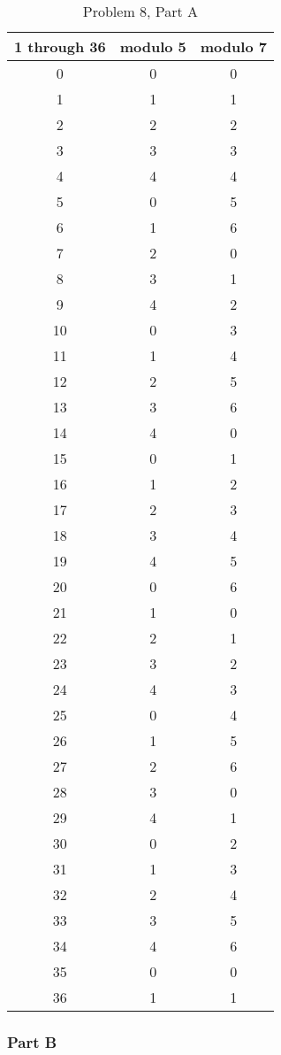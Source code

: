 \documentclass[11pt]{article}
\begin{document}
\begin{table}[htdp]
\caption{Problem 8, Part A}
\begin{center}
\begin{tabular}{|c|c|c|}
\hline
1 through 36 & modulo 5 & modulo 7 \\\hline
0 & 0 & 0 \\
1 & 1 & 1 \\
2 & 2 & 2 \\
3 & 3 & 3 \\
4 & 4 & 4 \\
5 & 0 & 5 \\
6 & 1 & 6 \\
7 & 2 & 0 \\
8 & 3 & 1 \\
9 & 4 & 2 \\
10 & 0 & 3 \\
11 & 1 & 4 \\
12 & 2 & 5 \\
13 & 3 & 6 \\
14 & 4 & 0 \\
15 & 0 & 1 \\
16 & 1 & 2 \\
17 & 2 & 3 \\
18 & 3 & 4 \\
19 & 4 & 5 \\
20 & 0 & 6 \\
21 & 1 & 0 \\
22 & 2 & 1 \\
23 & 3 & 2 \\
24 & 4 & 3 \\
25 & 0 & 4 \\
26 & 1 & 5 \\
27 & 2 & 6 \\
28 & 3 & 0 \\
29 & 4 & 1 \\
30 & 0 & 2 \\
31 & 1 & 3 \\
32 & 2 & 4 \\
33 & 3 & 5 \\
34 & 4 & 6 \\
35 & 0 & 0 \\
36 & 1 & 1 \\
\hline
\end{tabular}
\end{center}
\label{default}
\end{table}


\subsubsection*{Part B} 
\end{document}
